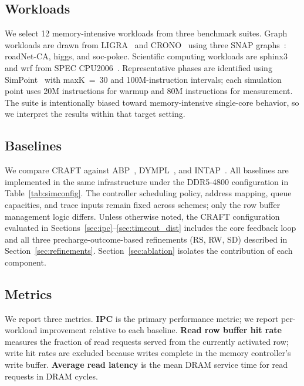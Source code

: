\documentclass[runningheads]{llncs}
\begin{document}
\subsection{Workloads}

We select 12 memory-intensive workloads from three benchmark suites. Graph workloads are drawn from LIGRA~\cite{Shun13} and CRONO~\cite{Ahmad15} using three SNAP graphs~\cite{Leskovec16}: roadNet-CA, higgs, and soc-pokec. Scientific computing workloads are sphinx3 and wrf from SPEC CPU2006~\cite{SPEC06}. Representative phases are identified using SimPoint~\cite{Sherwood02} with maxK~=~30 and 100M-instruction intervals; each simulation point uses 20M instructions for warmup and 80M instructions for measurement. The suite is intentionally biased toward memory-intensive single-core behavior, so we interpret the results within that target setting.

\subsection{Baselines}
\label{sec:baselines_meth}

We compare CRAFT against ABP~\cite{Awasthi11}, DYMPL~\cite{Rafique22}, and INTAP~\cite{Intel06}. All baselines are implemented in the same infrastructure under the DDR5-4800 configuration in Table~\ref{tab:simconfig}. The controller scheduling policy, address mapping, queue capacities, and trace inputs remain fixed across schemes; only the row buffer management logic differs. Unless otherwise noted, the CRAFT configuration evaluated in Sections~\ref{sec:ipc}--\ref{sec:timeout_dist} includes the core feedback loop and all three precharge-outcome-based refinements (RS, RW, SD) described in Section~\ref{sec:refinements}. Section~\ref{sec:ablation} isolates the contribution of each component.

\subsection{Metrics}

We report three metrics. \textbf{IPC} is the primary performance metric; we report per-workload improvement relative to each baseline. \textbf{Read row buffer hit rate} measures the fraction of read requests served from the currently activated row; write hit rates are excluded because writes complete in the memory controller's write buffer. \textbf{Average read latency} is the mean DRAM service time for read requests in DRAM cycles.
\end{document}

